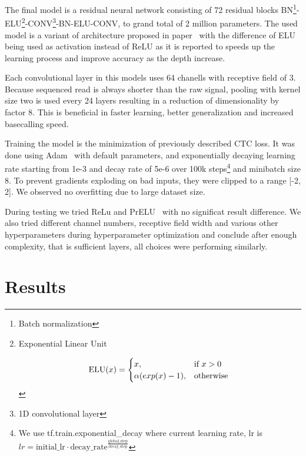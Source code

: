 \documentclass[runningheads,a4paper]{llncs}
\begin{document}
The final model is a residual neural network consisting of 72 residual blocks BN\footnote{Batch normalization}-ELU\footnote{Exponential Linear Unit

\begin{equation*}
\text{ELU}(x)=
    \begin{cases}
        x, & \text{if}\ x>0 \\
        \alpha (exp(x) - 1), & \text{otherwise}
        \end{cases}    \\
\end{equation*}

}-CONV\footnote{1D convolutional layer}-BN-ELU-CONV, to grand total of 2 million parameters. The used model is a variant of architecture proposed in paper~\cite{identitet} with the difference of ELU being used as activation instead of ReLU as it is reported \cite{resnet-elu} to speeds up the learning process and improve accuracy as the depth increase.

Each convolutional layer in this models uses 64 chanells with receptive field of 3. Because sequenced read is always shorter than the raw signal, pooling with kernel size two is used every 24 layers resulting in a reduction of dimensionality by factor 8. This is beneficial in faster learning, better generalization and increased basecalling speed.

Training the model is the minimization of previously described CTC loss. It was done using Adam~\cite{adam} with default parameters, and exponentially decaying learning rate starting from 1e-3 and decay rate of 5e-6 over 100k steps\footnote{We use tf.train.exponential\_decay where current learning rate, lr is $lr=\text{initial\_lr} \cdot \text{decay\_rate}^\frac{\text{global\_step}}{\text{decay\_step}}$} and minibatch size 8. To prevent gradients exploding on bad inputs, they were clipped to a range [-2, 2]. We observed no overfitting due to large dataset size.

During testing we tried ReLu and PrELU~\cite{prelu} with no significat result difference. We also tried different channel numbers, receptive field width and various other hyperparameters during hyperparameter optimization and conclude after enough complexity, that is sufficient layers, all choices were performing similarly.

\section{Results}
\end{document}
